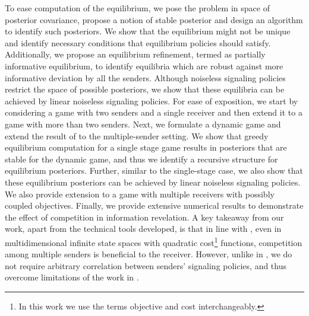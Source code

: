 \documentclass[12pt,journal,onecolumn]{IEEEtran}
\begin{document}
To ease computation of the equilibrium, we pose the problem in space of posterior covariance, propose a notion of stable posterior and design an algorithm to identify such posteriors. We show that the equilibrium might not be unique and identify necessary conditions that equilibrium policies should satisfy. Additionally, we propose an equilibrium refinement, termed as partially informative equilibrium, to identify equilibria which are robust against more informative deviation by all the senders. Although noiseless signaling policies restrict the space of possible posteriors\cite{tamura2018bayesian}, we show that these equilibria can be achieved by linear noiseless signaling policies. For ease of exposition, we start by considering a game with two senders and a single receiver and then extend it to a game with more than two senders. Next, we formulate a dynamic game and extend the result of \cite{sayin2019hierarchical} to the multiple-sender setting. We show that greedy equilibrium computation for a single stage game results in posteriors that are stable for the dynamic game, and thus we identify a recursive structure for equilibrium posteriors. Further, similar to the single-stage case, we also show that these equilibrium posteriors can be achieved by linear noiseless signaling policies. We also provide extension to a game with multiple receivers with possibly coupled objectives. Finally, we provide extensive numerical results to demonstrate the effect of competition in information revelation. A key takeaway from our work, apart from the technical tools developed, is that in line with \cite{gentzkow2017bayesian}, even in multidimensional infinite state spaces with quadratic cost\footnote{In this work we use the terms objective and cost interchangeably.} functions, competition among multiple senders is beneficial to the receiver. However, unlike in \cite{gentzkow2017bayesian}, we do not require arbitrary correlation between senders' signaling policies, and thus overcome limitations of the work in \cite{gentzkow2017bayesian}.
\end{document}
